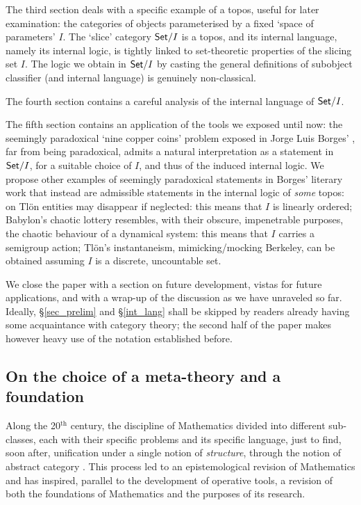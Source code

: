 The third section deals with a specific example of a topos, useful for later examination: the categories of objects parameterised by a fixed `space of parameters' $I$. The `slice' category $\mathsf{Set}/I$ is a topos, and its internal language, namely its internal logic, is tightly linked to set-theoretic properties of the slicing set $I$. The logic we obtain in $\mathsf{Set}/I$ by casting the general definitions of subobject classifier (and internal language) is genuinely non-classical.

The fourth section contains a careful analysis of the internal language of $\mathsf{Set}/I$.

The fifth section contains an application of the tools we exposed until now: the seemingly paradoxical `nine copper coins' problem exposed in Jorge Luis Borges' \cite{Borges1963}, far from being paradoxical, admits a natural interpretation as a statement in $\mathsf{Set}/I$, for a suitable choice of $I$, and thus of the induced internal logic. We propose other examples of seemingly paradoxical statements in Borges' literary work that instead are admissible statements in the internal logic of \emph{some} topos: on Tl\"on entities may disappear if neglected: this means that $I$ is linearly ordered; Babylon's chaotic lottery resembles, with their obscure, impenetrable purposes, the chaotic behaviour of a dynamical system: this means that $I$ carries a semigroup action; Tl\"on's instantaneism, mimicking/mocking Berkeley, can be obtained assuming $I$ is a discrete, uncountable set.

We close the paper with a section on future development, vistas for future applications, and with a wrap-up of the discussion as we have unraveled so far. Ideally, §\ref{sec_prelim} and §\ref{int_lang} shall be skipped by readers already having some acquaintance with category theory; the second half of the paper makes however heavy use of the notation established before.
\subsection{On the choice of a meta-theory and a foundation}
Along the 20$^\text{th}$ century, the discipline of Mathematics divided into different sub-classes, each with their specific problems and its specific language, just to find, soon after, unification under a single notion of \emph{structure}, through the notion of abstract category \cite{gtone}. This process led to an epistemological revision of Mathematics and has inspired, parallel to the development of operative tools, a revision of both the foundations of Mathematics and the purposes of its research.

